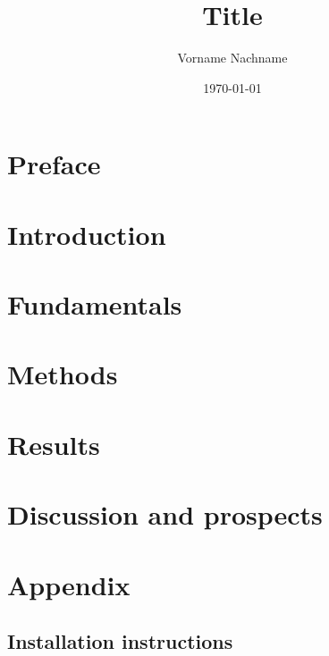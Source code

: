 \documentclass[a4paper, abstract=on]{scrreprt}
\title{Title}
\author{Vorname Nachname}
\date{\today}
\begin{document}


\clearpage



\begin{abstract}

\end{abstract}

\chapter*{Preface}

\thispagestyle{empty}

\tableofcontents
\thispagestyle{empty}


\chapter{Introduction}
\setcounter{page}{1}


\chapter{Fundamentals}


\chapter{Methods}


\chapter{Results}


\chapter{Discussion and prospects}


\newpage

\listoffigures

\printbibliography[title=Bibliography]

\appendix
\chapter{Appendix}
\section{Installation instructions}

\end{document}
